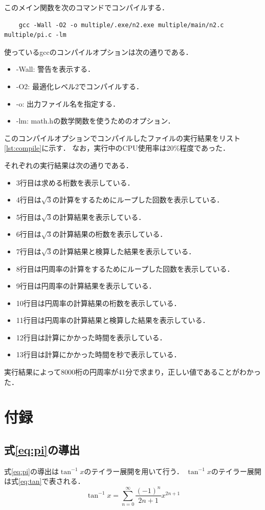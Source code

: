 \documentclass[a4paper,11pt,dvipdfmx]{jsarticle}
\begin{document}
このメイン関数を次のコマンドでコンパイルする．

\begin{verbatim}
    gcc -Wall -O2 -o multiple/.exe/n2.exe multiple/main/n2.c multiple/pi.c -lm
\end{verbatim}

使っているgccのコンパイルオプションは次の通りである．
\begin{itemize}
    \item -Wall: 警告を表示する．
    \item -O2: 最適化レベル2でコンパイルする．
    \item -o: 出力ファイル名を指定する．
    \item -lm: math.hの数学関数を使うためのオプション．
\end{itemize}

このコンパイルオプションでコンパイルしたファイルの実行結果をリスト\ref{lst:compile}に示す．
なお，実行中のCPU使用率は20\%程度であった．



それぞれの実行結果は次の通りである．
\begin{itemize}
\item3行目は求める桁数を表示している．
\item4行目は$\sqrt{3}$の計算をするためにループした回数を表示している．
\item5行目は$\sqrt{3}$の計算結果を表示している．
\item6行目は$\sqrt{3}$の計算結果の桁数を表示している．
\item7行目は$\sqrt{3}$の計算結果と検算した結果を表示している．
\item8行目は円周率の計算をするためにループした回数を表示している．
\item9行目は円周率の計算結果を表示している．
\item10行目は円周率の計算結果の桁数を表示している．
\item11行目は円周率の計算結果と検算した結果を表示している．
\item12行目は計算にかかった時間を表示している．
\item13行目は計算にかかった時間を秒で表示している．
\end{itemize}
実行結果によって8000桁の円周率が41分で求まり，正しい値であることがわかった．


\section{付録}
\label{sec:appendix}

\subsection{式\eqref{eq:pi}の導出}
\label{sec:eq_pi}
式\eqref{eq:pi}の導出は$\tan^{-1} x$のテイラー展開を用いて行う．
$\tan^{-1} x$のテイラー展開は式\eqref{eq:tan}で表される．
\begin{equation}
  \label{eq:tan}
  \tan^{-1} x = \sum_{n=0}^{\infty} \frac{(-1)^n}{2n + 1}x^{2n + 1}
\end{equation}
\end{document}

